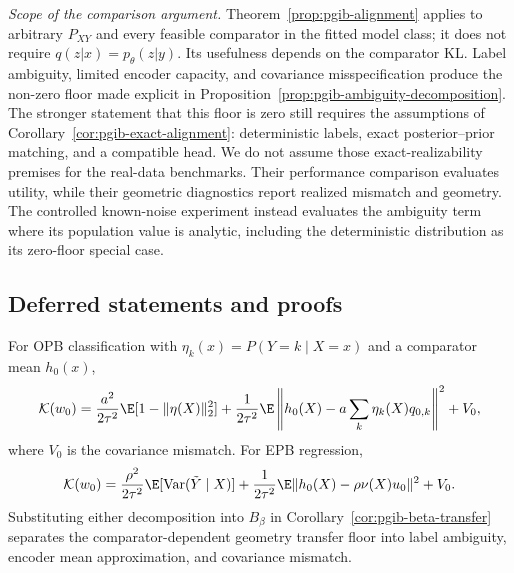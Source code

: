 \emph{Scope of the comparison argument.} Theorem~\ref{prop:pgib-alignment} applies to
arbitrary $P_{XY}$ and every feasible comparator in the fitted model class; it does not
require $q(z|x)=p_\theta(z|y)$. Its usefulness depends on the comparator KL. Label
ambiguity, limited encoder capacity, and covariance misspecification produce the
non-zero floor made explicit in Proposition~\ref{prop:pgib-ambiguity-decomposition}.
The stronger statement that this floor is zero still requires the assumptions of
Corollary~\ref{cor:pgib-exact-alignment}: deterministic labels, exact posterior--prior
matching, and a compatible head. We do not assume those exact-realizability premises
for the real-data benchmarks. Their performance comparison evaluates utility, while
their geometric diagnostics report realized mismatch and geometry. The controlled
known-noise experiment instead evaluates the ambiguity term where its population value
is analytic, including the deterministic distribution as its zero-floor special case.

\subsection{Deferred statements and proofs}

\begin{proposition}
\label{prop:pgib-ambiguity-decomposition}
For OPB classification with $\eta_k(x)=P(Y=k\mid X=x)$ and a comparator mean $h_0(x)$,
\begin{equation}
\mathcal K(w_0)=\frac{a^2}{2\tau^2}\E[1-\|\eta(X)\|_2^2]
+\frac1{2\tau^2}\E\left\|h_0(X)-a\sum_k\eta_k(X)q_{0,k}\right\|^2+V_0,
\label{eq:opb-ambiguity-decomposition}
\end{equation}
where $V_0$ is the covariance mismatch. For EPB regression,
\begin{equation}
\mathcal K(w_0)=\frac{\rho^2}{2\tau^2}\E[\operatorname{Var}(\tilde Y\mid X)]
+\frac1{2\tau^2}\E\|h_0(X)-\rho\nu(X)u_0\|^2+V_0.
\label{eq:epb-ambiguity-decomposition}
\end{equation}
Substituting either decomposition into $B_\beta$ in
Corollary~\ref{cor:pgib-beta-transfer} separates the comparator-dependent geometry
transfer floor into label ambiguity, encoder mean approximation, and covariance
mismatch.
\end{proposition}


